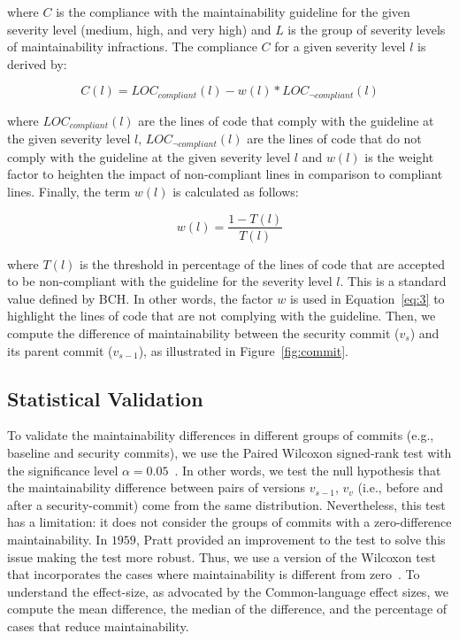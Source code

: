 \documentclass[10pt,conference]{IEEEtran}
\begin{document}
\noindent
where $C$ is the compliance with the maintainability guideline for the given
severity level (medium, high, and very high) and $L$ is the group of severity
levels of maintainability infractions. The compliance $C$ for a given severity
level $l$ is derived by:

\begin{equation}\label{eq:3}
    C(l) = LOC_{compliant}(l) - w(l) * LOC_{\neg compliant}(l)
\end{equation}

\noindent
where $LOC_{compliant}(l)$ are the lines of code that comply with the guideline
at the given severity level $l$, $LOC_{\neg compliant}(l)$ are the lines of code
that do not comply with the guideline at the given severity level $l$ and $w(l)$
is the weight factor to heighten the impact of non-compliant lines in comparison to
compliant lines. Finally, the term $w(l)$ is calculated as follows:

\begin{equation}
    w(l) = \frac{1 - T(l)}{T(l)}
\end{equation}

\noindent
where $T(l)$ is the threshold in percentage of the lines of code that are
accepted to be non-compliant with the guideline for the severity level $l$. This
is a standard value defined by BCH. In other words, the factor $w$ is used in
Equation~\ref{eq:3} to highlight the lines of code that are not complying with
the guideline. Then, we compute the difference of maintainability between the
security commit ($v_{s}$) and its parent commit ($v_{s-1}$), as illustrated in
Figure~\ref{fig:commit}.

\subsection{Statistical Validation}\label{sec:statsval}
%
To validate the maintainability differences in different groups of commits
(e.g., baseline and security commits), we use the Paired Wilcoxon signed-rank
test with the significance level $\alpha = 0.05$~\cite{10.2307/3001968}. In
other words, we test the null hypothesis that the maintainability difference
between pairs of versions $v_{s-1}$, $v_v$ (i.e., before and after a
security-commit) come from the same distribution. Nevertheless, this test has a
limitation: it does not consider the groups of commits with a zero-difference
maintainability. In $1959$, Pratt provided an improvement to the test to solve
this issue making the test more robust. Thus, we use a version of the Wilcoxon
test that incorporates the cases where maintainability is different from zero~\cite{10.2307/2282543}.
To understand the effect-size, as
advocated by the Common-language effect sizes\cite{graw:1992}, we compute the
mean difference, the median of the difference, and the percentage of cases that
reduce maintainability.
%
\end{document}
